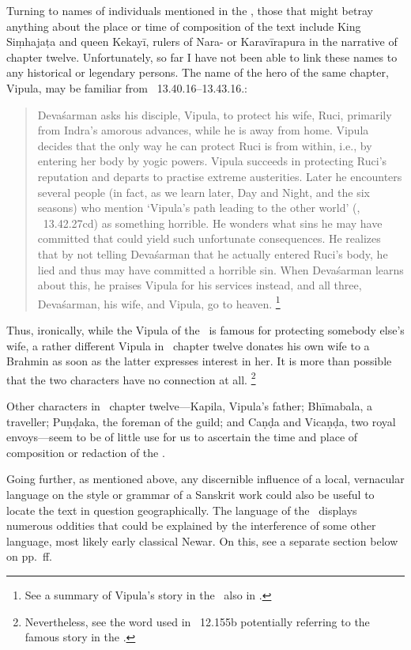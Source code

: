 Turning to names of individuals mentioned in the \VSS,
those that might betray anything about the place or
time of composition of the text include King Siṃhajaṭa
and queen Kekayī, rulers of Nara- or Karavīrapura
in the narrative of chapter twelve. Unfortunately,
so far I have not been able to link these names to
any historical or legendary persons. The name of the
hero of the same chapter, Vipula,\label{Vipula} may be familiar 
from \MBH\ 13.40.16--13.43.16.: 

\begin{quote}
Devaśarman asks his disciple,
Vipula, to protect his wife, Ruci, primarily from Indra's
amorous advances, while he is away from home.
Vipula decides that the only way he can protect Ruci
is from within, i.e., by entering her body by yogic powers.
Vipula succeeds in protecting Ruci's reputation and 
departs to practise extreme austerities. Later he 
encounters several people (in fact,
as we learn later, Day and Night,
and the six seasons) who mention `Vipula's path leading to
the other world' (, 
\MBH\ 13.42.27cd) as something horrible. He 
wonders what sins he may have committed that
could yield such unfortunate consequences. He
realizes that by not telling Devaśarman that he
actually entered Ruci's body, he lied and thus
may have committed a horrible sin. When Devaśarman learns
about this, he praises Vipula for his services instead, 
and all three, Devaśarman, his wife, and Vipula,
go to heaven.%
		\footnote{See a summary of Vipula's story in the 
			\MBH\ also in 
			.}
\end{quote}

\noindent
Thus, ironically, while the Vipula of the \MBH\ is famous
for protecting somebody else's wife,  
a rather different Vipula
in \VSS\ chapter twelve donates
his own wife to a Brahmin as soon as the latter expresses
interest in her. It is more than possible that
the two characters have no connection at all.%
	\footnote{Nevertheless, see the word  used
	in \VSS\ 12.155b potentially referring to the famous
	story in the \MBh.}

Other characters in \VSS\ chapter twelve---Kapila, 
Vipula's father;
Bhīmabala, a traveller; Puṇḍaka, the foreman of the guild;
and Caṇḍa and Vicaṇḍa, two royal envoys---seem 
to be of little use for us to ascertain the time and place of composition or redaction of the \VSS. 

Going further, as mentioned above, any discernible influence
of a local, vernacular language on the style or grammar of
a Sanskrit work could also be useful to
locate the text in question geographically. 
The language of the \VSS\
displays numerous oddities that could be
explained by the interference of some other 
language, most likely early classical Newar.
On this, see a separate section below on 
pp.~\pageref{newar}ff.


